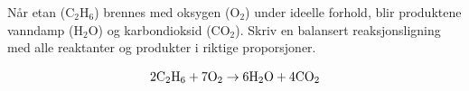 

Når etan (C$_{2}$H$_{6}$) brennes med oksygen (O$_{2}$) under ideelle forhold, blir produktene vanndamp (H$_{2}$O) og karbondioksid (CO$_{2}$). Skriv en balansert reaksjonsligning med alle reaktanter og produkter i riktige proporsjoner.







$$\hbox{2C}_2\hbox{H}_6 + \hbox{7O}_2 \to \hbox{6H}_2\hbox{O} + \hbox{4CO}_2$$









